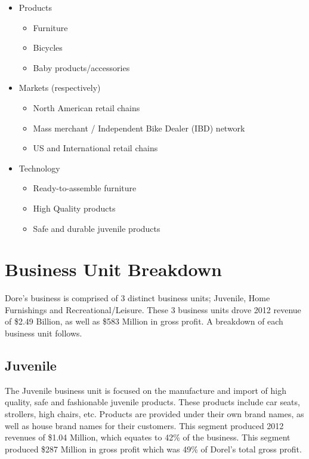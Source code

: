 \begin{itemize}        	
  \item Products
    \begin{itemize}
      \item Furniture
      \item Bicycles
      \item Baby products/accessories
    \end{itemize}
  \item Markets (respectively)
    \begin{itemize}     
      \item North American retail chains
      \item Mass merchant / Independent Bike Dealer (IBD) network
      \item US and International retail chains
    \end{itemize}
  \item Technology
    \begin{itemize}     
      \item Ready-to-assemble furniture
      \item High Quality products
      \item Safe and durable juvenile products
    \end{itemize}
\end{itemize}


\section{Business Unit Breakdown}
Dore’s business is comprised of 3 distinct business units; Juvenile, Home Furnishings and Recreational/Leisure.  These 3 business units drove 2012 revenue of \$2.49 Billion, as well as \$583 Million in gross profit. A breakdown of each business unit follows.

\subsection{Juvenile}
The Juvenile business unit is focused on the manufacture and import of high quality, safe and fashionable juvenile products.  These products include car seats, strollers, high chairs, etc.  Products are provided under their own brand names, as well as house brand names for their customers. This segment produced 2012 revenues of \$1.04 Million, which equates to 42\% of the business. This segment produced \$287 Million in gross profit which was 49\% of Dorel’s total gross profit.

